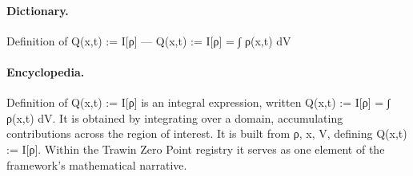\paragraph{Dictionary.}
Definition of Q(x,t) := I[ρ] — Q(x,t) := I[ρ] = ∫ ρ(x,t) dV

\paragraph{Encyclopedia.}
Definition of Q(x,t) := I[ρ] is an integral expression, written Q(x,t) := I[ρ] = ∫ ρ(x,t) dV. It is obtained by integrating over a domain, accumulating contributions across the region of interest. It is built from ρ, x, V, defining Q(x,t) := I[ρ]. Within the Trawin Zero Point registry it serves as one element of the framework's mathematical narrative.
